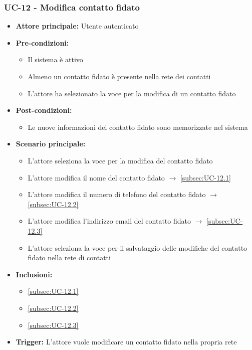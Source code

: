 \documentclass[a4paper,12pt]{article}
\begin{document}
\subsubsection{UC-12 - Modifica contatto fidato} \label{subsec:UC-12}
\begin{itemize}
    \item \textbf{Attore principale:} Utente autenticato
    \item \textbf{Pre-condizioni:} 
    \begin{itemize}
        \item Il sistema è attivo
        \item Almeno un contatto fidato è presente nella rete dei contatti
        \item L'attore ha selezionato la voce per la modifica di un contatto fidato
    \end{itemize}
    \item \textbf{Post-condizioni:}
    \begin{itemize}
        \item Le nuove informazioni del contatto fidato sono memorizzate nel sistema
    \end{itemize}
    \item \textbf{Scenario principale:} 
    \begin{itemize}
        \item L'attore seleziona la voce per la modifica del contatto fidato
        \item L'attore modifica il nome del contatto fidato $\rightarrow$ \ref{subsec:UC-12.1}
        \item L'attore modifica il numero di telefono del contatto fidato $\rightarrow$ \ref{subsec:UC-12.2}
        \item L'attore modifica l'indirizzo email del contatto fidato $\rightarrow$ \ref{subsec:UC-12.3}
        \item L'attore seleziona la voce per il salvataggio delle modifiche del contatto fidato nella rete di contatti
    \end{itemize}
    \item \textbf{Inclusioni:}
    \begin{itemize}
        \item \ref{subsec:UC-12.1}
        \item \ref{subsec:UC-12.2}
        \item \ref{subsec:UC-12.3}
    \end{itemize}
    \item \textbf{Trigger:} L'attore vuole modificare un contatto fidato nella propria rete
\end{itemize}
\end{document}
